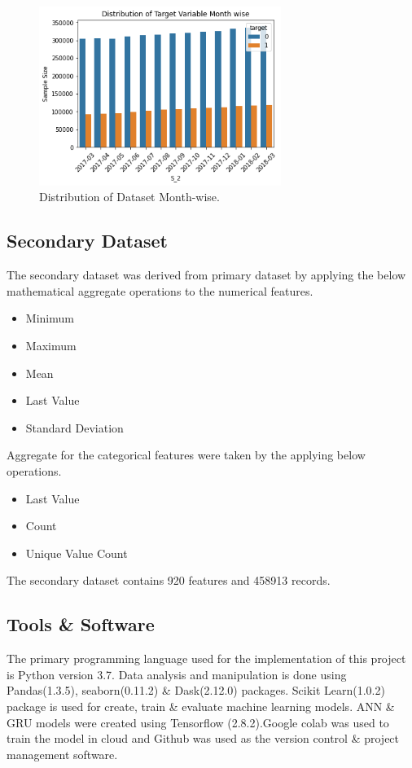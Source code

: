 \documentclass[twoside,11pt,a4paper]{article}
\begin{document}
\begin{figure}[ht]
	\centering
	\includegraphics[width=0.7\textwidth]{dist_class_monthwise}
	\caption[Distribution of Dataset Month-wise]{Distribution of Dataset Month-wise.}
	\label{fig:dist_class_monthwise}
\end{figure}
\FloatBarrier
\subsection{Secondary Dataset}
The secondary dataset was derived from primary dataset by applying the below mathematical aggregate operations to the numerical features.
\begin{itemize}
	\item Minimum 
	\item Maximum
	\item Mean
	\item Last Value
	\item Standard Deviation
\end{itemize}

Aggregate for the categorical features were taken by the applying below operations.
\begin{itemize}
	\item Last Value
	\item Count
	\item Unique Value Count
\end{itemize}

The secondary dataset contains 920 features and 458913 records.

\subsection{Tools \& Software}
The primary programming language used for the implementation of this project is Python version 3.7. Data analysis and manipulation is done using Pandas(1.3.5), seaborn(0.11.2) \& Dask(2.12.0) packages. Scikit Learn(1.0.2) package is used for create, train \& evaluate machine learning models. \acs{ANN} \& \acs{GRU} models were created using Tensorflow (2.8.2).Google colab was used to train the model in cloud and Github was used as the version control \& project management software.
\end{document}
